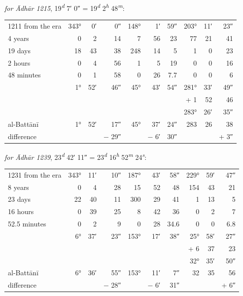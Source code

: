 \documentclass[11pt]{article}
\begin{document}
\par \emph{for Ādhār 1215}, 19\textsuperscript{\itshape d} 7′ 0″ = 19\textsuperscript{\itshape d} 2\textsuperscript{\itshape h} 48\textsuperscript{\itshape m}:\par
\begin{center}\small\begin{tabular}{lrrrrrrrrr}
1211 from the era & 343° & 0′ & 0″ & 148° & 1′ & 59″ & 203° & 11′ & 23″ \\
4 years & 0 & 2 & 14 & 7 & 56 & 23 & 77 & 21 & 41 \\
19 days & 18 & 43 & 38 & 248 & 14 & 5 & 1 & 0 & 23 \\
2 hours & 0 & 4 & 56 & 1 & 5 & 19 & 0 & 0 & 16 \\
48 minutes & 0 & 1 & 58 & 0 & 26 & 7.7 & 0 & 0 & 6 \\
\midrule
 & 1° & 52′ & 46″ & 45° & 43′ & 54″ & 281° & 33′ & 49″ \\
 &  &  &  &  &  &  & + 1 & 52 & 46 \\
 &  &  &  &  &  &  & 283° & 26′ & 35″ \\
al-Battānī & 1° & 52′ & 17″ & 45° & 37′ & 24″ & 283 & 26 & 38 \\
difference &  &  & − 29″ &  & − 6′ & 30″ &  &  & + 3″ \\
\end{tabular}\end{center}
\par \emph{for Ādhār 1239}, 23\textsuperscript{\itshape d} 42′ 11″ = 23\textsuperscript{\itshape d} 16\textsuperscript{\itshape h} 52\textsuperscript{\itshape m} 24\textsuperscript{\itshape s}:\par
\begin{center}\small\begin{tabular}{lrrrrrrrrr}
1231 from the era & 343° & 11′ & 10″ & 187° & 43′ & 58″ & 229° & 59′ & 47″ \\
8 years & 0 & 4 & 28 & 15 & 52 & 48 & 154 & 43 & 21 \\
23 days & 22 & 40 & 11 & 300 & 29 & 41 & 1 & 13 & 5 \\
16 hours & 0 & 39 & 25 & 8 & 42 & 36 & 0 & 2 & 7 \\
52.5 minutes & 0 & 2 & 9 & 0 & 28 & 34.6 & 0 & 0 & 6.8 \\
\midrule
 & 6° & 37′ & 23″ & 153° & 17′ & 38″ & 25° & 58′ & 27″ \\
 &  &  &  &  &  &  & + 6 & 37 & 23 \\
 &  &  &  &  &  &  & 32° & 35′ & 50″ \\
al-Battānī & 6° & 36′ & 55″ & 153° & 11′ & 7″ & 32 & 35 & 56 \\
difference &  &  & − 28″ &  & − 6′ & 31″ &  &  & + 6″ \\
\end{tabular}\end{center}
\end{document}
